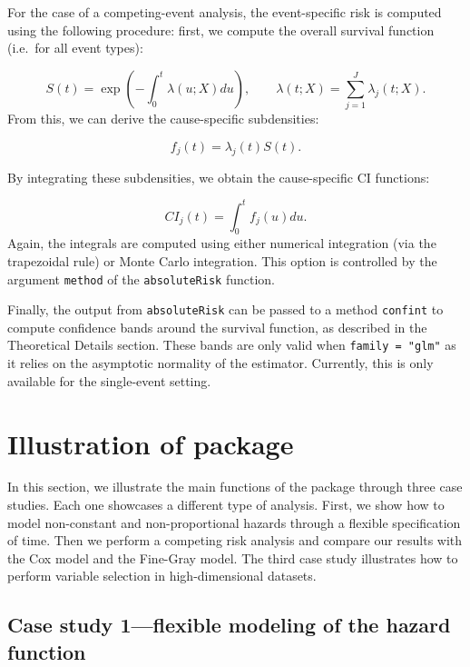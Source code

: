 For the case of a competing-event analysis, the event-specific risk is computed using the following procedure: first, we compute the overall survival function (i.e.~for all event types):

\[ S(t) = \exp\left(-\int_0^t \lambda(u;X) du\right),\qquad \lambda(t;X) = \sum_{j=1}^J \lambda_j(t;X).\]
From this, we can derive the cause-specific subdensities:

\[ f_j(t) = \lambda_j(t)S(t).\]

By integrating these subdensities, we obtain the cause-specific CI functions:

\[ CI_j(t) = \int_0^t f_j(u)du.\]
Again, the integrals are computed using either numerical integration (via the trapezoidal rule) or Monte Carlo integration. This option is controlled by the argument \texttt{method} of the \texttt{absoluteRisk} function.

Finally, the output from \texttt{absoluteRisk} can be passed to a method \texttt{confint} to compute confidence bands around the survival function, as described in the Theoretical Details section. These bands are only valid when \texttt{family\ =\ "glm"} as it relies on the asymptotic normality of the estimator. Currently, this is only available for the single-event setting.

\hypertarget{illustration-of-package}{%
\section{Illustration of package}\label{illustration-of-package}}

In this section, we illustrate the main functions of the  package through three case studies. Each one showcases a different type of analysis. First, we show how to model non-constant and non-proportional hazards through a flexible specification of time. Then we perform a competing risk analysis and compare our results with the Cox model and the Fine-Gray model. The third case study illustrates how to perform variable selection in high-dimensional datasets.

\hypertarget{case-study-1flexible-modeling-of-the-hazard-function}{%
\subsection{Case study 1---flexible modeling of the hazard function}\label{case-study-1flexible-modeling-of-the-hazard-function}}

